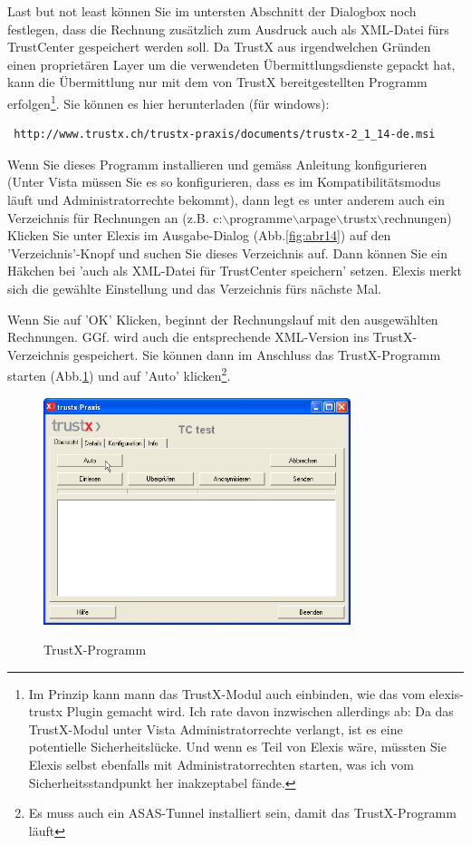 \documentclass[a4paper]{scrartcl}
\begin{document}
Last but not least können Sie im untersten Abschnitt der Dialogbox noch festlegen, dass die Rechnung zusätzlich zum Ausdruck auch als XML-Datei fürs TrustCenter gespeichert werden soll.
Da TrustX aus irgendwelchen Gründen einen proprietären Layer um die verwendeten Übermittlungsdienste gepackt hat, kann die Übermittlung nur mit dem von TrustX bereitgestellten Programm erfolgen\footnote{Im Prinzip kann mann das TrustX-Modul auch einbinden, wie das vom elexis-trustx Plugin gemacht wird. Ich rate davon inzwischen allerdings ab: Da das TrustX-Modul unter Vista Administratorrechte verlangt, ist es eine potentielle Sicherheitslücke. Und wenn es Teil von Elexis wäre, müssten Sie Elexis selbst ebenfalls mit Administratorrechten starten, was ich vom Sicherheitsstandpunkt her inakzeptabel fände.}. Sie können es hier herunterladen (für windows):
\begin {verbatim}
 http://www.trustx.ch/trustx-praxis/documents/trustx-2_1_14-de.msi
\end{verbatim}
Wenn Sie dieses Programm installieren und gemäss Anleitung konfigurieren (Unter Vista müssen Sie es so konfigurieren, dass es im Kompatibilitätsmodus läuft und Administratorrechte bekommt), dann legt es unter anderem auch ein Verzeichnis für Rechnungen an (z.B. c:$\backslash$programme$\backslash$arpage$\backslash$trustx$\backslash$rechnungen)
Klicken Sie unter Elexis im Ausgabe-Dialog  (Abb.\ref{fig:abr14}) auf den 'Verzeichnis'-Knopf und suchen Sie dieses Verzeichnis auf. Dann können Sie ein Häkchen bei 'auch als XML-Datei für TrustCenter speichern' setzen. Elexis merkt sich die gewählte Einstellung und das Verzeichnis fürs nächste Mal.

\medskip

Wenn Sie auf  'OK' Klicken, beginnt der Rechnungslauf mit den ausgewählten Rechnungen. GGf. wird auch die entsprechende XML-Version ins TrustX-Verzeichnis gespeichert. Sie können dann im Anschluss das TrustX-Programm starten (Abb.\ref{fig:abr15}) und auf 'Auto' klicken\footnote{Es muss auch ein ASAS-Tunnel installiert sein, damit das TrustX-Programm läuft}.

\begin{figure}
  \includegraphics[width=0.8\textwidth]{abr15}\\
  \caption{TrustX-Programm}\label{fig:abr15}
\end{figure}
\end{document}
